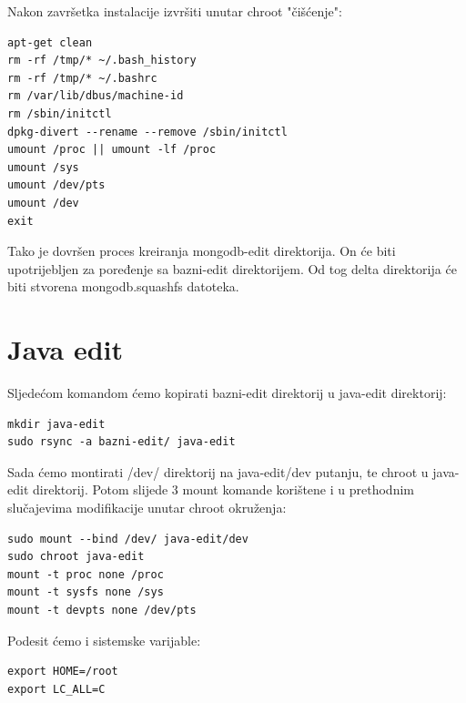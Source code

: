 \documentclass[12pt,vi]{mitthesis}
\begin{document}
\noindent
Nakon završetka instalacije izvršiti unutar chroot "čišćenje":
\begin{lstlisting}[style=BashInputStyle]
apt-get clean
rm -rf /tmp/* ~/.bash_history
rm -rf /tmp/* ~/.bashrc
rm /var/lib/dbus/machine-id
rm /sbin/initctl
dpkg-divert --rename --remove /sbin/initctl
umount /proc || umount -lf /proc
umount /sys
umount /dev/pts
umount /dev
exit
\end{lstlisting}

Tako je dovršen proces kreiranja mongodb-edit direktorija. On će biti upotrijebljen za poređenje sa bazni-edit direktorijem. Od tog delta direktorija će biti stvorena mongodb.squashfs datoteka.

\section*{Java edit}

\indent
Sljedećom komandom ćemo kopirati bazni-edit direktorij u java-edit direktorij:
\begin{lstlisting}[style=BashInputStyle]
mkdir java-edit
sudo rsync -a bazni-edit/ java-edit
\end{lstlisting}

Sada ćemo montirati /dev/ direktorij na java-edit/dev putanju, te chroot u java-edit direktorij. Potom slijede 3 mount komande korištene i u prethodnim slučajevima modifikacije unutar chroot okruženja:
\begin{lstlisting}[style=BashInputStyle]
sudo mount --bind /dev/ java-edit/dev
sudo chroot java-edit
mount -t proc none /proc
mount -t sysfs none /sys
mount -t devpts none /dev/pts
\end{lstlisting}

Podesit ćemo i sistemske varijable:
\begin{lstlisting}[style=BashInputStyle]
export HOME=/root
export LC_ALL=C
\end{lstlisting}
\end{document}
